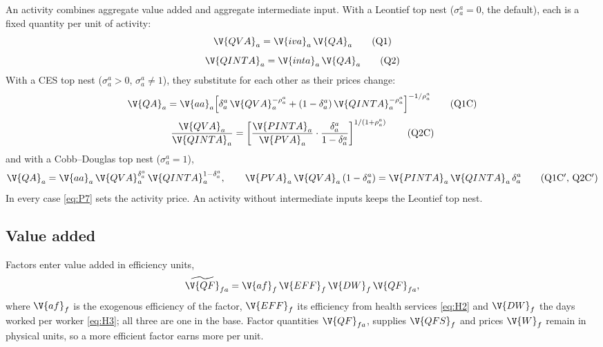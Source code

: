 An activity combines aggregate value added and aggregate intermediate input.
With a Leontief top nest ($\sigma^a_a = 0$, the default), each is a fixed
quantity per unit of activity:
\begin{equation}
\V{QVA}_a = \V{iva}_a\,\V{QA}_a
\tag{Q1}\label{eq:Q1}
\end{equation}
\begin{equation}
\V{QINTA}_a = \V{inta}_a\,\V{QA}_a
\tag{Q2}\label{eq:Q2}
\end{equation}
With a CES top nest ($\sigma^a_a > 0$, $\sigma^a_a \ne 1$), they substitute
for each other as their prices change:
\begin{equation}
\V{QA}_a = \V{aa}_a\Bigl[\delta^a_a\,\V{QVA}_a^{-\rho^a_a} + (1 - \delta^a_a)\,\V{QINTA}_a^{-\rho^a_a}\Bigr]^{-1/\rho^a_a}
\tag{Q1C}\label{eq:Q1C}
\end{equation}
\begin{equation}
\frac{\V{QVA}_a}{\V{QINTA}_a} = \left[\frac{\V{PINTA}_a}{\V{PVA}_a}\cdot\frac{\delta^a_a}{1 - \delta^a_a}\right]^{1/(1 + \rho^a_a)}
\tag{Q2C}\label{eq:Q2C}
\end{equation}
and with a Cobb--Douglas top nest ($\sigma^a_a = 1$),
\begin{equation}
\V{QA}_a = \V{aa}_a\,\V{QVA}_a^{\delta^a_a}\,\V{QINTA}_a^{1 - \delta^a_a},
\qquad \V{PVA}_a\,\V{QVA}_a\,(1 - \delta^a_a) = \V{PINTA}_a\,\V{QINTA}_a\,\delta^a_a
\tag{Q1C$'$, Q2C$'$}\label{eq:Q1CD}
\end{equation}
In every case \eqref{eq:P7} sets the activity price. An activity without
intermediate inputs keeps the Leontief top nest.

\subsection{Value added}

Factors enter value added in efficiency units,
\begin{equation*}
\widetilde{\V{QF}}_{fa} = \V{af}_f\,\V{EFF}_f\,\V{DW}_f\,\V{QF}_{fa},
\end{equation*}
where $\V{af}_f$ is the exogenous efficiency of the factor, $\V{EFF}_f$ its
efficiency from health services \eqref{eq:H2} and $\V{DW}_f$ the days worked
per worker \eqref{eq:H3}; all three are one in the base. Factor quantities
$\V{QF}_{fa}$, supplies $\V{QFS}_f$ and prices $\V{W}_f$ remain in physical
units, so a more efficient factor earns more per unit.

